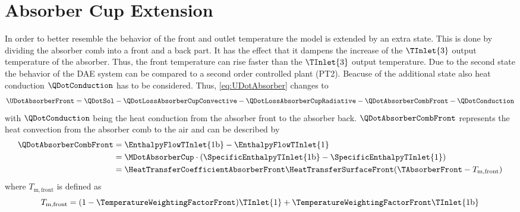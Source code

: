 




\section{Absorber Cup Extension}

In order to better resemble the behavior of the front and outlet temperature the model is extended by an extra state.
This is done by dividing the absorber comb into a front and a back part.
It has the effect that it dampens the increase of the \(\TInlet{3}\) output temperature of the absorber.
Thus, the front temperature can rise faster than the \(\TInlet{3}\) output temperature.
Due to the second state the behavior of the DAE system can be compared to a second order controlled plant (PT2).
Beacuse of the additional state also heat conduction \(\QDotConduction\) has to be considered.
Thus, \cref{eq:UDotAbsorber} changes to
\begin{equation}
\UDotAbsorberFront =\QDotSol - \QDotLossAbsorberCupConvective -  \QDotLossAbsorberCupRadiative -\QDotAbsorberCombFront - \QDotConduction
    \label{eq:UDotAbsorberExtended}
\end{equation}
with \(\QDotConduction\) being the heat conduction from the absorber front to the absorber back.
\(\QDotAbsorberCombFront\) represents the heat convection from the absorber comb to the air and can be described by
\begin{align}
\QDotAbsorberCombFront & = \EnthalpyFlowTInlet{\mathrm{1b}} - \EnthalpyFlowTInlet{1}                                             \\
& = \MDotAbsorberCup \cdot ( \SpecificEnthalpyTInlet{\mathrm{1b}} - \SpecificEnthalpyTInlet{1})           \\
& = \HeatTransferCoefficientAbsorberFront \HeatTransferSurfaceFront (\TAbsorberFront-T_{\mathrm{m,front}})
\end{align}
where \(T_{\mathrm{m,front}}\) is defined as
\begin{equation}
T_{\mathrm{m,front}} = (1-\TemperatureWeightingFactorFront) \TInlet{1} + \TemperatureWeightingFactorFront \TInlet{\mathrm{1b}}
\end{equation}
